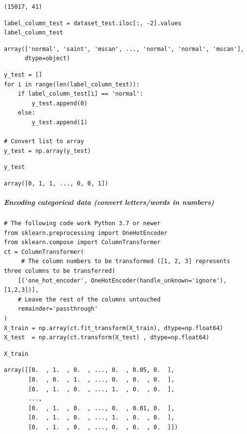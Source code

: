 \begin{verbatim}
(15017, 41)
\end{verbatim}

\begin{verbatim}
label_column_test = dataset_test.iloc[:, -2].values
label_column_test
\end{verbatim}

\begin{verbatim}
array(['normal', 'saint', 'mscan', ..., 'normal', 'normal', 'mscan'],
      dtype=object)
\end{verbatim}

\begin{verbatim}
y_test = []
for i in range(len(label_column_test)):
    if label_column_test[i] == 'normal':
        y_test.append(0)
    else:
        y_test.append(1)

# Convert list to array
y_test = np.array(y_test)
\end{verbatim}

\begin{verbatim}
y_test
\end{verbatim}

\begin{verbatim}
array([0, 1, 1, ..., 0, 0, 1])
\end{verbatim}

\subparagraph{Encoding categorical data (convert letters/words in numbers)}

\begin{verbatim}
# The following code work Python 3.7 or newer
from sklearn.preprocessing import OneHotEncoder
from sklearn.compose import ColumnTransformer
ct = ColumnTransformer(
     # The column numbers to be transformed ([1, 2, 3] represents three columns to be transferred)
    [('one_hot_encoder', OneHotEncoder(handle_unknown='ignore'), [1,2,3])],
    # Leave the rest of the columns untouched
    remainder='passthrough'
)
X_train = np.array(ct.fit_transform(X_train), dtype=np.float64)
X_test  = np.array(ct.transform(X_test) , dtype=np.float64)
\end{verbatim}

\begin{verbatim}
X_train
\end{verbatim}

\begin{verbatim}
array([[0.  , 1.  , 0.  , ..., 0.  , 0.05, 0.  ],
       [0.  , 0.  , 1.  , ..., 0.  , 0.  , 0.  ],
       [0.  , 1.  , 0.  , ..., 1.  , 0.  , 0.  ],
       ...,
       [0.  , 1.  , 0.  , ..., 0.  , 0.01, 0.  ],
       [0.  , 1.  , 0.  , ..., 1.  , 0.  , 0.  ],
       [0.  , 1.  , 0.  , ..., 0.  , 0.  , 0.  ]])
\end{verbatim}

